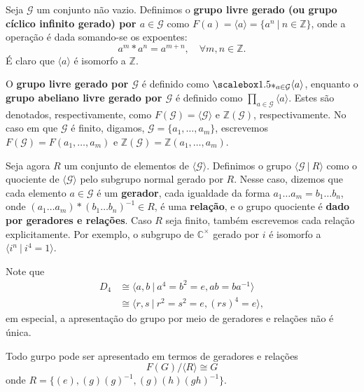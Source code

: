 \begin{defi}
    Seja $\mathcal{G}$ um conjunto não vazio. Definimos o \textbf{grupo livre gerado (ou grupo cíclico infinito gerado) por $a \in \mathcal{G}$} como $F(a) = \langle a\rangle = \{a^n~|~n \in \mathbb{Z}\}$, onde a operação é dada somando-se os expoentes:
    \[a^m * a^n = a^{m+n},\quad \forall m,n \in \mathbb{Z}.\]
    É claro que $\langle a\rangle$ é isomorfo a $\mathbb{Z}$.
    
    O \textbf{grupo livre gerado por $\mathcal{G}$} é definido como $\Ast_{a\in \mathcal{G}} \langle a\rangle$, enquanto o \textbf{grupo abeliano livre gerado por $\mathcal{G}$} é definido como $\prod_{a\in \mathcal{G}} \langle a\rangle$. Estes são denotados, respectivamente, como $F(\mathcal{G}) = \langle \mathcal{G}\rangle$ e $\mathbb{Z}(\mathcal{G})$, respectivamente. No caso em que $\mathcal{G}$ é finito, digamos, 
    $\mathcal{G} = \{a_1,\ldots, a_m\}$, escrevemos $F(\mathcal{G}) = F(a_1,\ldots, a_m)$ e $\mathbb{Z}(\mathcal{G}) = \mathbb{Z}(a_1, \ldots, a_m)$.
    
    Seja agora $R$ um conjunto de elementos de $\langle\mathcal{G}\rangle$. Definimos o grupo $\langle \mathcal{G}~|~R\rangle$ como o quociente de $\langle\mathcal{G}\rangle$ pelo subgrupo normal gerado por $R$. Nesse caso, dizemos que cada elemento $a \in \mathcal{G}$ é um \textbf{gerador}, cada igualdade da forma $a_1 \ldots a_m = b_1 \ldots b_n$, onde $(a_1 \ldots a_m) * (b_1 \ldots b_n)^{-1} \in R$, é uma \textbf{relação}, e o grupo quociente é \textbf{dado por geradores e relações}. Caso $R$ seja finito, também escrevemos cada relação explicitamente. Por exemplo, o subgrupo de $\mathbb{C}^{\times}$ gerado por $i$ é isomorfo a $\langle i^n ~|~ i^4 = 1\rangle$.
\end{defi}

\begin{ex}
    Note que
    \begin{align*}
        D_4 &\cong \langle a,b ~|~a^4 = b^2 = e, ab = ba^{-1} \rangle\\
        &\cong  \langle r,s~|~ r^2 = s^2 = e, (rs)^4=e \rangle,
    \end{align*}
    em especial, a apresentação do grupo por meio de geradores e relações não é única.
\end{ex} 

Todo gurpo pode ser apresentado em termos de geradores e relações 
\[F(G)/\langle R\rangle\cong G\]
onde $R=\{(e),(g)(g)^{-1},(g)(h)(gh)^{-1}\}.$